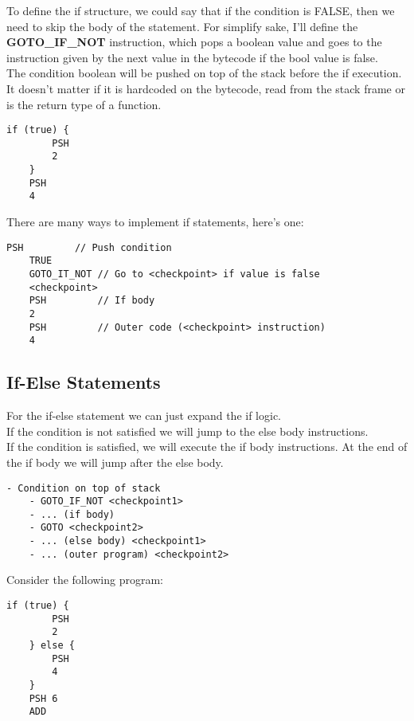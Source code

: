 \documentclass[../documentation.tex]{subfiles}
\begin{document}
To define the if structure, we could say that if the condition is FALSE, then we need to skip the body of the statement.
For simplify sake, I'll define the \textbf{GOTO\_IF\_NOT} instruction, which pops a boolean value and goes to the instruction
given by the next value in the bytecode if the bool value is false.
\\
The condition boolean will be pushed on top of the stack before the if execution. It doesn't matter if it is
hardcoded on the bytecode, read from the stack frame or is the return type of a function.

\pagebreak

\begin{lstlisting}[style=generic]
    if (true) {
        PSH
        2
    }
    PSH
    4
\end{lstlisting}

There are many ways to implement if statements, here's one:

\begin{lstlisting}[style=generic]
    PSH         // Push condition
    TRUE
    GOTO_IT_NOT // Go to <checkpoint> if value is false
    <checkpoint>
    PSH         // If body
    2
    PSH         // Outer code (<checkpoint> instruction)
    4
\end{lstlisting}

\subsection{If-Else Statements}

For the if-else statement we can just expand the if logic.
\\
If the condition is not satisfied we will jump to the else body instructions.
\\
If the condition is satisfied, we will execute the if body instructions. At the end of the if body
we will jump after the else body.

\begin{lstlisting}[style=generic]
    - Condition on top of stack
    - GOTO_IF_NOT <checkpoint1>
    - ... (if body)
    - GOTO <checkpoint2>
    - ... (else body) <checkpoint1>
    - ... (outer program) <checkpoint2>
\end{lstlisting}

Consider the following program:

\begin{lstlisting}[style=generic]
    if (true) {
        PSH
        2
    } else {
        PSH
        4
    }
    PSH 6
    ADD
\end{lstlisting}
\end{document}
